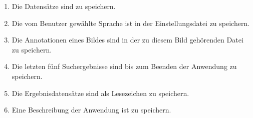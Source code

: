 \documentclass[parskip=full]{scrartcl}
\begin{document}
\begin{enumerate} [label=\bfseries /PD \arabic*0/]
	\item Die Datensätze sind zu speichern.
	\item Die vom Benutzer gewählte Sprache ist in der Einstellungsdatei zu speichern.
	\item Die Annotationen eines Bildes sind in der zu diesem Bild gehörenden Datei zu speichern.
	\item Die letzten fünf Suchergebnisse sind bis zum Beenden der Anwendung zu speichern.
	\item Die Ergebnisdatensätze sind als Lesezeichen zu speichern.
	\item Eine Beschreibung der Anwendung ist zu speichern. 

\end{enumerate}
\end{document}
